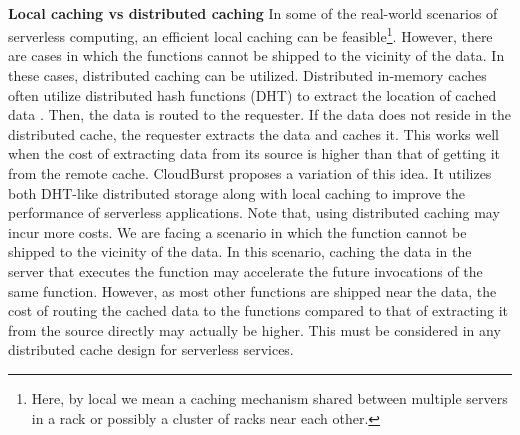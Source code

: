 \\
\noindent \textbf{Local caching vs distributed caching}
In some of the real-world scenarios of serverless computing, an efficient local caching can be feasible\footnote{Here, by local we mean a caching mechanism shared between multiple servers in a rack or possibly a cluster of racks near each other.}. However, there are cases in which the functions cannot be shipped to the vicinity of the data. In these cases, distributed caching can be utilized. 
Distributed in-memory caches often utilize distributed hash functions (DHT) to extract the location of cached data .  Then, the data is routed to the requester. If the data does not reside in the distributed cache, the requester extracts the data and caches it. This works well when the cost of extracting data from its source is higher than that of getting it from the remote cache. CloudBurst  proposes a variation of this idea. It utilizes both DHT-like distributed storage along with local caching to improve the performance of serverless applications. 
Note that, using distributed caching may incur more costs. We are facing a scenario in which the function cannot be shipped to the vicinity of the data. In this scenario, caching the data in the server that executes the function may accelerate the future invocations of the same function. However, as most other functions are shipped near the data, the cost of routing the cached data to the functions compared to that of extracting it from the source directly may actually be higher. This must be considered in any distributed cache design for serverless services.
\\

